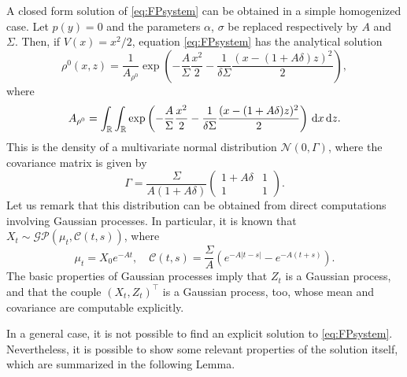 \documentclass[10pt]{article}
\begin{document}
\begin{example}\label{ex:OrnUhl} A closed form solution of \eqref{eq:FPsystem} can be obtained in a simple homogenized case. Let $p(y) = 0$ and the parameters $\alpha$, $\sigma$ be replaced respectively by $A$ and $\Sigma$. Then, if $V(x) = x^2/2$, equation \eqref{eq:FPsystem} has the analytical solution 
\begin{equation}
\rho^0(x,z) = \frac{1}{A_{\rho^0}} \exp\left(-\frac{A}{\Sigma} \frac{x^2}{2} - \frac{1}{\delta \Sigma} \frac{(x - (1+A \delta)z)^2}{2}\right),
\end{equation}
where
\begin{equation}
A_{\rho^0} = \int_{\mathbb{R}} \int_{\mathbb{R}} \exp\left(-\frac{A}{\Sigma} \frac{x^2}{2} - \frac{1}{\delta \Sigma} \frac{(x - (1+A \delta)z)^2}{2}\right) \,\mathrm{d} x \,\mathrm{d} z.
\end{equation}
This is the density of a multivariate normal distribution $\mathcal N(0, \Gamma)$, where the covariance matrix is given by
\begin{equation}
\Gamma = \frac{\Sigma}{A (1 + A\delta)} \begin{pmatrix} 1+A\delta & 1 \\ 1 & 1 \end{pmatrix}.
\end{equation}
Let us remark that this distribution can be obtained from direct computations involving Gaussian processes. In particular, it is known that $X_t \sim \mathcal{GP}(\mu_t, \mathcal C(t, s))$, where 
\begin{equation}
	\mu_t = X_0 e^{-At}, \quad \mathcal C(t, s) = \frac{\Sigma}{A} \left( e^{-A|t-s|} - e^{-A(t+s)} \right).
\end{equation}
The basic properties of Gaussian processes imply that $Z_t$ is a Gaussian process, and that the couple $(X_t, Z_t)^\top$ is a Gaussian process, too, whose mean and covariance are computable explicitly.
\end{example}

In a general case, it is not possible to find an explicit solution to \eqref{eq:FPsystem}. Nevertheless, it is possible to show some relevant properties of the solution itself, which are summarized in the following Lemma.
\end{document}
